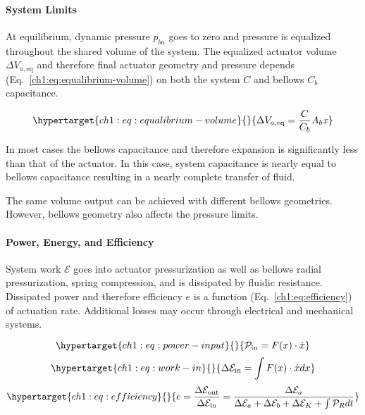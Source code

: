 \hypertarget{ch1:system-limits}{%
\paragraph{System Limits}\label{ch1:system-limits}}

At equilibrium, dynamic pressure \(p_{ba}\) goes to zero and pressure is
equalized throughout the shared volume of the system. The equalized
actuator volume \(\Delta V_{a,\text{eq}}\) and therefore final actuator
geometry and pressure depends (Eq.~\ref{ch1:eq:equalibrium-volume}) on both
the system \(C\) and bellows \(C_b\) capacitance.

\begin{equation}\protect\hypertarget{ch1:eq:equalibrium-volume}{}{ \Delta V_{a,\text{eq}} = \frac{C}{C_b} A_b x   
}\label{ch1:eq:equalibrium-volume}\end{equation}

In most cases the bellows capacitance and therefore expansion is
significantly less than that of the actuator. In this case, system
capacitance is nearly equal to bellows capacitance resulting in a nearly
complete transfer of fluid.

The same volume output can be achieved with different bellows
geometries. However, bellows geometry also affects the pressure limits.


\hypertarget{ch1:power-energy-and-efficiency}{%
\paragraph{Power, Energy, and Efficiency
}\label{ch1:power-energy-and-efficiency}}

System work \(\mathcal{E}\) goes into actuator pressurization as well as
bellows radial pressurization, spring compression, and is dissipated by
fluidic resistance. Dissipated power and therefore efficiency \(e\) is a
function (Eq.~\ref{ch1:eq:efficiency}) of actuation rate. Additional losses
may occur through electrical and mechanical systems.

\begin{equation}\protect\hypertarget{ch1:eq:power-input}{}{ \mathcal{P}_\text{in} = F(x) \cdot \dot{x}   
}\label{ch1:eq:power-input}\end{equation}
\begin{equation}\protect\hypertarget{ch1:eq:work-in}{}{ \Delta \mathcal{E}_\text{in} = \int F(x) \cdot \dot{x} dx  
}\label{ch1:eq:work-in}\end{equation}
\begin{equation}\protect\hypertarget{ch1:eq:efficiency}{}{ e = \frac{ \Delta \mathcal{E}_\text{out} }   
            { \Delta \mathcal{E}_\text{in} }
     = \frac{ \Delta \mathcal{E}_a }   
            { \Delta \mathcal{E}_a   
            + \Delta \mathcal{E}_b   
            + \Delta \mathcal{E}_K   
            + \int \mathcal{P}_R dt }   
}\label{ch1:eq:efficiency}\end{equation}

